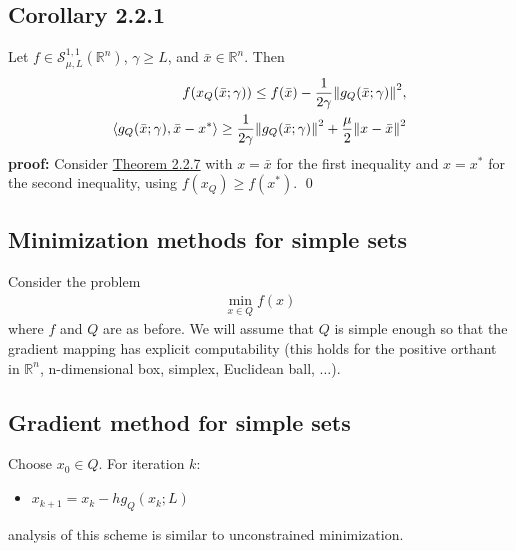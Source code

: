 \documentclass[12pt,a4paper]{article}
\begin{document}
	\subsection*{Corollary 2.2.1}\label{cor221}
	Let $f \in \mathcal{S}_{\mu, L}^{1,1}(\mathbb{R}^n)$, $\gamma \geq L$, and $\bar{x} \in \mathbb{R}^n$. Then
	\begin{align}
		f(x_Q(\bar{x};\gamma)) \leq f(\bar{x}) - \frac{1}{2\gamma}\norm{g_Q(\bar{x};\gamma)}^2, \\
		\langle g_Q(\bar{x};\gamma), \bar{x} - x^* \rangle \geq \frac{1}{2\gamma}\norm{g_Q(\bar{x};\gamma)}^2 + \frac{\mu}{2}\norm{x - \bar{x}}^2
	\end{align}
	\textbf{proof:} Consider \hyperref[thm227]{Theorem 2.2.7} with $x = \bar{x}$ for the first inequality and $x = x^*$ for the second inequality, using $f(x_Q) \geq f(x^*)$. \qed
	
	\subsection*{Minimization methods for simple sets}\label{sec:mmss}
	Consider the problem
	\begin{align*}
		\min_{x \in Q}f(x)
	\end{align*}
	where $f$ and $Q$ are as before. We will assume that $Q$ is simple enough so that the gradient mapping has explicit computability (this holds for the positive orthant in $\mathbb{R}^n$, n-dimensional box, simplex, Euclidean ball, $\ldots$).
	
	\subsection*{Gradient method for simple sets}\label{gradss}
	Choose $x_0 \in Q$. For iteration $k$:
	\begin{itemize}
		\item $x_{k+1} = x_k - hg_Q(x_k;L)$
	\end{itemize} 
	analysis of this scheme is similar to unconstrained minimization.
\end{document}
